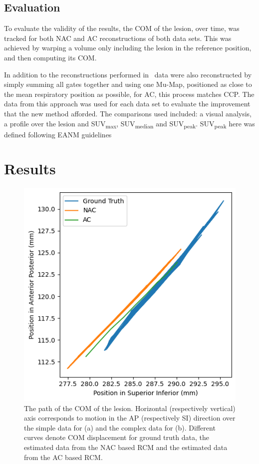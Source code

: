     \subsection{Evaluation} \label{sec:evaluation}
        To evaluate the validity of the  results, the \gls{COM} of the lesion, over time, was tracked for both \gls{NAC} and \gls{AC} reconstructions of both data sets. This was achieved by warping a volume only including the lesion in the reference position, and then computing its \gls{COM}.
        
        In addition to the reconstructions performed in~ data were also reconstructed by simply summing all gates together and using one \gls{Mu-Map}, positioned as close to the mean respiratory position as possible, for \gls{AC}, this process matches \gls{CCP}. The data from this approach was used for each data set to evaluate the improvement that the new method afforded. The comparisons used included: a visual analysis, a profile over the lesion and \gls{SUV}\textsubscript{max}, \gls{SUV}\textsubscript{median} and \gls{SUV}\textsubscript{peak}. \gls{SUV}\textsubscript{peak} here was defined following \gls{EANM} guidelines~\cite{Boellaard2015FDG2.0}

\section{Results} \label{sec:results}
    \begin{figure}
        \centering
        \includegraphics[width=0.5\linewidth]{figures/com.png}
        \captionsetup{singlelinecheck=false, justification=centering}
        \caption{The path of the \gls{COM} of the lesion. Horizontal (respectively vertical) axis corresponds to motion in the \gls{AP} (respectively \gls{SI}) direction over the simple data for (a) and the complex data for (b). Different curves denote \gls{COM} displacement for  ground truth data, the estimated data from the \gls{NAC} based \gls{RCM} and the estimated data from the \gls{AC} based \gls{RCM}.}
        \label{fig:com}
    \end{figure}
    
